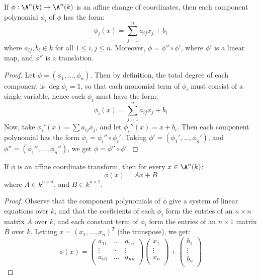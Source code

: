 \begin{proposition}\label{proposition_2.2.1}
  If $\phi:\A^n(k) \xrightarrow{} \A^n(k)$ is an affine change of coordinates,
  then each component polynomial $\phi_i$ of  $\phi$ has the form:
  \begin{equation}\label{equation_2.2}
    \phi_i(x)=\sum_{j=1}^n{a_{ij}x_j}+b_i
  \end{equation}
  where $a_{ij}, b_i \in k$ for all $1 \leq i,j \leq n$. Moreover, $\phi=\phi''
  \circ \phi'$, where $\phi'$ is a linear map, and $\phi''$ is a translation.
\end{proposition}
\begin{proof}
  Let $\phi=(\phi_1, \dots, \phi_n)$. Then by definition, the total degree of
  each component is $\deg{\phi_i}=1$, so that each monomial term of $\phi_i$
  must consist of a single variable, hence each $\phi_i$ must have the form:
  \begin{equation*}
    \phi_i(x)=\sum_{j=1}^n{a_{ij}x_j}+b_i
  \end{equation*}
  Now, take $\phi_i'(x)=\sum{a_{ij}x_j}$, and let $\phi_i''(x)=x+b_i$. Then each
  component polynomial has the form $\phi_i=\phi_i'' \circ \phi_i'$. Taking
  $\phi'=(\phi_1', \dots, \phi_n')$, and $\phi''=(\phi_1'', \dots, \phi_n'')$,
  we get $\phi=\phi'' \circ \phi'$.
\end{proof}
\begin{corollary}
  If $\phi$ is an affine coordinate transform, then for every $x \in \A^n(k)$:
  \begin{equation}\label{equation_2.3}
    \phi(x)=Ax+B
  \end{equation}
  where $A \in k^{n \times n}$, and $B \in k^{n \times 1}$.
\end{corollary}
\begin{proof}
  Observe that the component polynomials of $\phi$ give a system of linear
  equations over $k$, and that the coeficients of each $\phi_i$ form the entries
  of an $n \times n$ matrix $A$ over $k$, and each constant term of $\phi_i$
  form the  entries of an $n \times 1$ matrix $B$ over $k$. Letting $x=(x_1,
  \dots, x_n)^T$ (the transpose), we get:
  \begin{equation*}
    \phi(x)=
    \begin{pmatrix}
      a_{11}    &   \dots   &   a_{1n}  \\
      \vdots    &   \ddots  &   \vdots  \\
      a_{n1}    &   \dots   &   a_{nn}  \\
    \end{pmatrix}
    \begin{pmatrix}
      x_1 \\  \vdots  \\  x_n \\
    \end{pmatrix}
    +
    \begin{pmatrix}
      b_1 \\  \vdots  \\  b_n \\
    \end{pmatrix}
  \end{equation*}
\end{proof}

